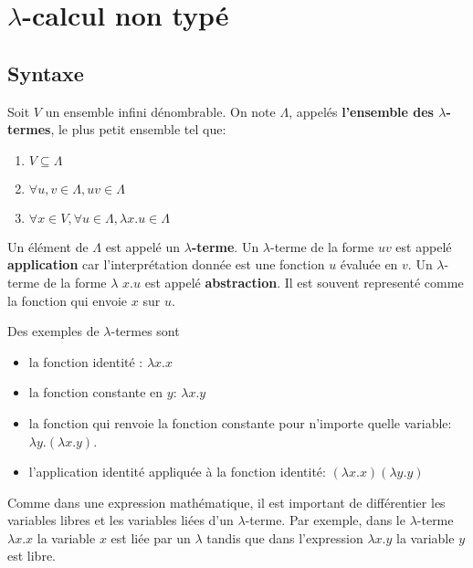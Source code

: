 \chapter{$\lambda$-calcul non typé}

\section{Syntaxe}

\begin{definition} 
  Soit $V$ un ensemble infini dénombrable. On note $\Lambda$, appelés \textbf{l'ensemble des $\lambda$-termes}, le plus petit
  ensemble tel que:
  \begin{enumerate}
    \item $V \subseteq \Lambda$
    \item $\forall u, v \in \Lambda, uv \in \Lambda$
    \item $\forall x \in V, \forall u \in \Lambda, \lambda x.u \in \Lambda$
  \end{enumerate}

\end{definition}

Un élément de $\Lambda$ est appelé un \textbf{$\lambda$-terme}.
Un $\lambda$-terme de la forme $uv$ est appelé \textbf{application} car
l'interprétation donnée est une fonction $u$ évaluée en $v$.
Un $\lambda$-terme de la forme $\lambda$ $x.u$ est appelé
\textbf{abstraction}. Il est souvent representé comme la fonction qui envoie
$x$ sur $u$.

Des exemples de $\lambda$-termes sont
\begin{itemize}
  \item la fonction identité : $\lambda x . x$
  \item la fonction constante en $y$: $\lambda x . y$
  \item la fonction qui renvoie la fonction constante pour n'importe quelle
    variable: $\lambda y . (\lambda x . y)$.
  \item l'application identité appliquée à la fonction identité: $(\lambda x . x)
    (\lambda y . y)$
\end{itemize}

Comme dans une expression mathématique, il est important de différentier les
variables libres et les variables liées d'un $\lambda$-terme. Par exemple, dans
le $\lambda$-terme $\lambda x . x$ la variable $x$ est liée par un $\lambda$
tandis que dans l'expression $\lambda x . y$ la variable $y$ est libre.

